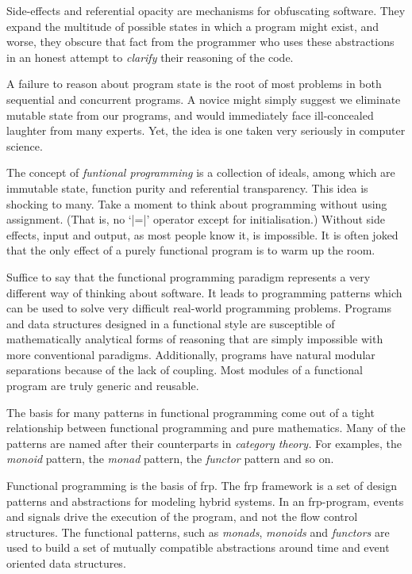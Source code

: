 Side-effects and referential opacity are mechanisms for obfuscating software.
They expand the multitude of possible states in which a program might exist, and
worse, they obscure that fact from the programmer who uses these abstractions in
an honest attempt to \emph{clarify} their reasoning of the code.

A failure to reason about program state is the root of most problems in both
sequential and concurrent programs. A novice might simply suggest we eliminate
mutable state from our programs, and would immediately face ill-concealed
laughter from many experts. Yet, the idea is one taken very seriously in
computer science.

The concept of \emph{funtional programming} is a collection of ideals, among
which are immutable state, function purity and referential transparency. This
idea is shocking to many. Take a moment to think about programming without using
assignment. (That is, no `|=|' operator except for initialisation.) Without side
effects, input and output, as most people know it, is impossible. It is often
joked that the only effect of a purely functional program is to warm up the
room.

Suffice to say that the functional programming paradigm represents a very
different way of thinking about software. It leads to programming patterns which
can be used to solve very difficult real-world programming problems. Programs
and data structures designed in a functional style are susceptible of
mathematically analytical forms of reasoning that are simply impossible with
more conventional paradigms. Additionally, programs have natural modular
separations because of the lack of coupling. Most modules of a functional
program are truly generic and reusable.

The basis for many patterns in functional programming come out of a tight
relationship between functional programming and pure mathematics. Many of the
patterns are named after their counterparts in \emph{category theory.} For
examples, the \emph{monoid} pattern, the \emph{monad} pattern, the
\emph{functor} pattern and so on.

Functional programming is the basis of \ac{frp}. The \ac{frp} framework is a set of design patterns and
abstractions for modeling hybrid systems. In an \ac{frp}-program, events and
signals drive the execution of the program, and not the flow control structures.
The functional patterns, such as \emph{monads},
\emph{monoids} and \emph{functors} are used to
build a set of mutually compatible abstractions around time and event oriented
data structures.

